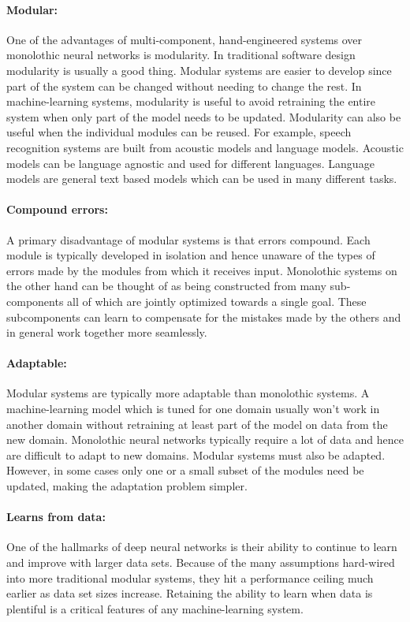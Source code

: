 \documentclass[main.tex]{subfiles}
\begin{document}
\paragraph{Modular:} One of the advantages of multi-component, hand-engineered
systems over monolothic neural networks is modularity. In traditional software
design modularity is usually a good thing. Modular systems are easier to
develop since part of the system can be changed without needing to change the
rest. In machine-learning systems, modularity is useful to avoid retraining the
entire system when only part of the model needs to be updated. Modularity can
also be useful when the individual modules can be reused. For example, speech
recognition systems are built from acoustic models and language models.
Acoustic models can be language agnostic and used for different languages.
Language models are general text based models which can be used in many
different tasks.

\paragraph{Compound errors:} A primary disadvantage of modular systems is that
errors compound. Each module is typically developed in isolation and hence
unaware of the types of errors made by the modules from which it receives
input. Monolothic systems on the other hand can be thought of as being
constructed from many sub-components all of which are jointly optimized towards
a single goal. These subcomponents can learn to compensate for the mistakes
made by the others and in general work together more seamlessly.

\paragraph{Adaptable:} Modular systems are typically more adaptable than
monolothic systems. A machine-learning model which is tuned for one domain
usually won't work in another domain without retraining at least part of the
model on data from the new domain. Monolothic neural networks typically require
a lot of data and hence are difficult to adapt to new domains. Modular systems
must also be adapted. However, in some cases only one or a small subset of the
modules need be updated, making the adaptation problem simpler.

\paragraph{Learns from data:} One of the hallmarks of deep neural networks is
their ability to continue to learn and improve with larger data sets. Because
of the many assumptions hard-wired into more traditional modular systems, they
hit a performance ceiling much earlier as data set sizes increase. Retaining
the ability to learn when data is plentiful is a critical features of any
machine-learning system.
\end{document}
